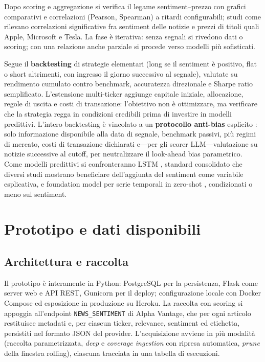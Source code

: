\documentclass[a4paper,11pt]{article}
\begin{document}
Dopo scoring e aggregazione si verifica il legame sentiment--prezzo con grafici comparativi e correlazioni (Pearson, Spearman) a ritardi configurabili; studi come \textcite{cristescu2023wavelet} rilevano correlazioni significative fra sentiment delle notizie e prezzi di titoli quali Apple, Microsoft e Tesla. La fase è iterativa: senza segnali si rivedono dati o scoring; con una relazione anche parziale si procede verso modelli più sofisticati.

Segue il \textbf{backtesting} di strategie elementari (long se il sentiment è positivo, flat o short altrimenti, con ingresso il giorno successivo al segnale), valutate su rendimento cumulato contro benchmark, accuratezza direzionale e Sharpe ratio semplificato. L'estensione multi-ticker aggiunge capitale iniziale, allocazione, regole di uscita e costi di transazione: l'obiettivo non è ottimizzare, ma verificare che la strategia regga in condizioni credibili prima di investire in modelli predittivi. L'intero backtesting è vincolato a un \textbf{protocollo anti-bias} esplicito \parencite{li2025finsaber}: solo informazione disponibile alla data di segnale, benchmark passivi, più regimi di mercato, costi di transazione dichiarati e---per gli scorer LLM---valutazione su notizie successive al cutoff, per neutralizzare il look-ahead bias parametrico. Come modelli predittivi si confronteranno LSTM \parencite{fischer2018deep, ouf2024lstm}, standard consolidato che diversi studi mostrano beneficiare dell'aggiunta del sentiment come variabile esplicativa, e foundation model per serie temporali in zero-shot \parencite{ansari2024chronos, das2024timesfm}, condizionati o meno sul sentiment.

\section{Prototipo e dati disponibili}
\label{sec:prototipo}

\subsection{Architettura e raccolta}

Il prototipo è interamente in Python: PostgreSQL per la persistenza, Flask come server web e API REST, Gunicorn per il deploy; configurazione locale con Docker Compose ed esposizione in produzione su Heroku. La raccolta con scoring si appoggia all'endpoint \texttt{NEWS\_SENTIMENT} di Alpha Vantage, che per ogni articolo restituisce metadati e, per ciascun ticker, relevance, sentiment ed etichetta, persistiti nel formato JSON del provider. L'acquisizione avviene in più modalità (raccolta parametrizzata, \emph{deep} e \emph{coverage ingestion} con ripresa automatica, \emph{prune} della finestra rolling), ciascuna tracciata in una tabella di esecuzioni.
\end{document}
